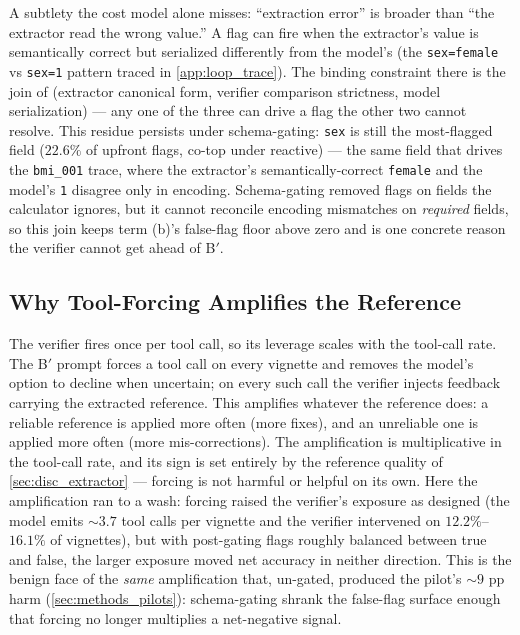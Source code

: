 A subtlety the cost model alone misses: ``extraction error'' is
broader than ``the extractor read the wrong value.'' A flag can fire
when the extractor's value is semantically correct but serialized
differently from the model's (the \texttt{sex=female} vs
\texttt{sex=1} pattern traced in \cref{app:loop_trace}). The binding
constraint there is the join of (extractor canonical form, verifier
comparison strictness, model serialization) --- any one of the three
can drive a flag the other two cannot resolve. This residue persists
under schema-gating: \texttt{sex} is still the most-flagged field
($22.6\%$ of upfront flags, co-top under reactive) --- the same field
that drives the \texttt{bmi\_001} trace, where the extractor's
semantically-correct \texttt{female} and the model's \texttt{1} disagree
only in encoding. Schema-gating removed flags on fields the calculator
ignores, but it cannot reconcile encoding mismatches on \emph{required}
fields, so this join keeps term (b)'s false-flag floor above zero and
is one concrete reason the verifier cannot get ahead of B$'$.

\subsection{Why Tool-Forcing Amplifies the Reference}
\label{sec:disc_toolforcing}

The verifier fires once per tool call, so its leverage scales with the
tool-call rate. The B$'$ prompt forces a tool call on every vignette
and removes the model's option to decline when uncertain; on every
such call the verifier injects feedback carrying the extracted
reference. This amplifies whatever the reference does: a reliable
reference is applied more often (more fixes), and an unreliable one is
applied more often (more mis-corrections). The amplification is
multiplicative in the tool-call rate, and its sign is set entirely by
the reference quality of \cref{sec:disc_extractor} --- forcing is not
harmful or helpful on its own. Here the amplification ran to a wash:
forcing raised the verifier's exposure as designed (the model emits
$\sim$$3.7$ tool calls per vignette and the verifier intervened on
$12.2\%$--$16.1\%$ of vignettes), but with post-gating flags roughly
balanced between true and false, the larger exposure moved net accuracy
in neither direction. This is the benign face of the \emph{same}
amplification that, un-gated, produced the pilot's $\sim$$9$ pp harm
(\cref{sec:methods_pilots}): schema-gating shrank the false-flag surface
enough that forcing no longer multiplies a net-negative signal.

